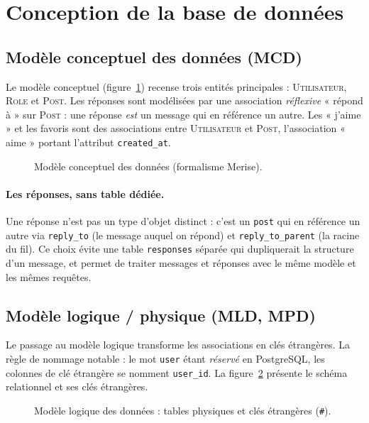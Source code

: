 \section{Conception de la base de données}
\label{sec:bdd}

\subsection{Modèle conceptuel des données (MCD)}

Le modèle conceptuel (figure~\ref{fig:mcd}) recense trois entités principales :
\textsc{Utilisateur}, \textsc{Role} et \textsc{Post}. Les réponses sont modélisées par une
association \emph{réflexive} « répond à » sur \textsc{Post} : une réponse \emph{est} un message
qui en référence un autre. Les « j'aime » et les favoris sont des associations entre
\textsc{Utilisateur} et \textsc{Post}, l'association « aime » portant l'attribut
\texttt{created\_at}.

\begin{figure}[ht]
\centering
\resizebox{0.95\textwidth}{!}{}
\caption{Modèle conceptuel des données (formalisme Merise).}
\label{fig:mcd}
\end{figure}

\paragraph{Les réponses, sans table dédiée.} Une réponse n'est pas un type d'objet distinct :
c'est un \texttt{post} qui en référence un autre via \texttt{reply\_to} (le message auquel on
répond) et \texttt{reply\_to\_parent} (la racine du fil). Ce choix évite une table \texttt{responses}
séparée qui dupliquerait la structure d'un message, et permet de traiter messages et réponses avec
le même modèle et les mêmes requêtes.

\subsection{Modèle logique / physique (MLD, MPD)}

Le passage au modèle logique transforme les associations en clés étrangères. La règle de
nommage notable : le mot \texttt{user} étant \emph{réservé} en PostgreSQL, les colonnes de clé
étrangère se nomment \texttt{user\_id}. La figure~\ref{fig:mld} présente le schéma relationnel
et ses clés étrangères.

\begin{figure}[ht]
\centering
\resizebox{\textwidth}{!}{}
\caption{Modèle logique des données : tables physiques et clés étrangères (\texttt{\#}).}
\label{fig:mld}
\end{figure}

